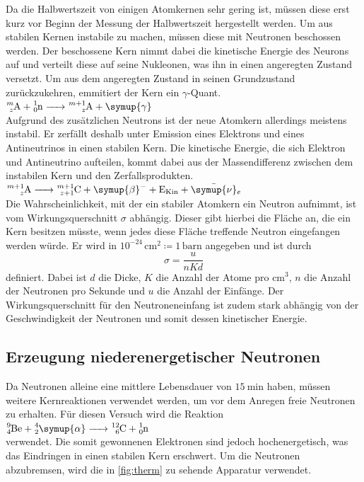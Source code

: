 Da die Halbwertszeit von einigen Atomkernen sehr gering ist, müssen diese erst kurz vor Beginn der Messung der Halbwertszeit hergestellt werden. Um aus stabilen Kernen
instabile zu machen, müssen diese mit Neutronen beschossen werden. Der beschossene Kern nimmt dabei die kinetische Energie des Neurons auf und verteilt diese auf seine
Nukleonen, was ihn in einen angeregten Zustand versetzt. Um aus dem angeregten Zustand in seinen Grundzustand zurückzukehren, emmitiert der Kern ein $\gamma$-Quant. \\
\newline
$\ce{^{m}_zA + ^{1}_0n -> ^{m+1}_zA + \symup{\gamma}}$ \\
\newline
Aufgrund des zusätzlichen Neutrons ist der neue Atomkern allerdings meistens instabil. Er zerfällt deshalb unter Emission eines Elektrons und eines Antineutrinos in einen
stabilen Kern. Die kinetische Energie, die sich Elektron und Antineutrino aufteilen, kommt dabei aus der Massendifferenz zwischen dem instabilen Kern und den
Zerfallsprodukten. \\
\newline
$  \ce{  ^{m+1}_zA -> ^{m+1}_{z+1}C + \symup{\beta}- + E_{Kin} + \bar{\symup{\nu}}_e}   $ \\
\newline
Die Wahrscheinlichkeit, mit der ein stabiler Atomkern ein Neutron aufnimmt, ist vom Wirkungsquerschnitt $\sigma$ abhängig. Dieser gibt hierbei die Fläche an, die ein Kern
besitzen müsste, wenn jedes diese Fläche treffende Neutron eingefangen werden würde. Er wird in $10^{-24} \, \si{\centi\metre\squared} \coloneqq 1 \, \mathrm{barn}$
angegeben und ist durch
\begin{equation}
    \label{eqn:Sigma}
    \sigma = \frac{u}{nKd}
\end{equation}
definiert. Dabei ist $d$ die Dicke, $K$ die Anzahl der Atome pro $\unit{\centi\meter^3}$, $n$ die Anzahl der Neutronen pro Sekunde und $u$ die Anzahl der Einfänge.
Der Wirkungsquerschnitt für den Neutroneneinfang ist zudem stark abhängig von der Geschwindigkeit der Neutronen und
somit dessen kinetischer Energie.


\subsection{Erzeugung niederenergetischer Neutronen}

Da Neutronen alleine eine mittlere Lebensdauer von $\SI{15}{\minute}$ haben, müssen weitere Kernreaktionen verwendet werden, um vor dem Anregen freie Neutronen zu erhalten.
Für diesen Versuch wird die Reaktion \\
\newline
$\ce{^{9}_{4}Be + ^{4}_{2}\symup{\alpha} -> ^{12}_{6}C + ^{1}_0n}$ \\
\newline
verwendet. Die somit gewonnenen Elektronen sind jedoch hochenergetisch, was das Eindringen in einen stabilen Kern erschwert. Um die Neutronen abzubremsen, wird die in
\autoref{fig:therm} zu sehende Apparatur verwendet.

